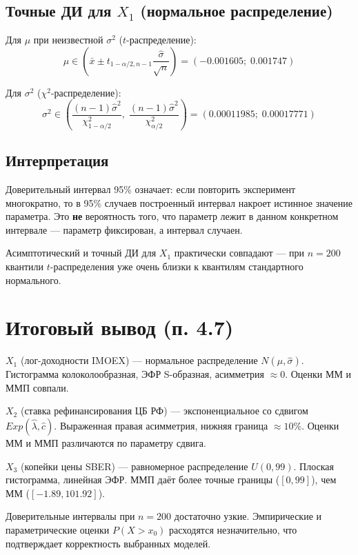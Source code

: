 \documentclass[12pt, a4paper]{article}
\begin{document}
\subsection{Точные ДИ для $X_1$ (нормальное распределение)}

Для $\mu$ при неизвестной $\sigma^2$ ($t$-распределение):
$$\mu \in \left(\bar x \pm t_{1-\alpha/2, n-1}\frac{\hat\sigma}{\sqrt{n}}\right) = (-0.001605;\; 0.001747)$$

Для $\sigma^2$ ($\chi^2$-распределение):
$$\sigma^2 \in \left(\frac{(n-1)\hat\sigma^2}{\chi^2_{1-\alpha/2}},\; \frac{(n-1)\hat\sigma^2}{\chi^2_{\alpha/2}}\right) = (0.00011985;\; 0.00017771)$$

\subsection{Интерпретация}

Доверительный интервал 95\% означает: если повторить эксперимент многократно, то в 95\% случаев построенный интервал накроет истинное значение параметра. Это \textbf{не} вероятность того, что параметр лежит в данном конкретном интервале --- параметр фиксирован, а интервал случаен.

Асимптотический и точный ДИ для $X_1$ практически совпадают --- при $n = 200$ квантили $t$-распределения уже очень близки к квантилям стандартного нормального.

\section{Итоговый вывод (п. 4.7)}

\textbf{$X_1$} (лог-доходности IMOEX) --- нормальное распределение $N(\hat\mu, \hat\sigma)$. Гистограмма колоколообразная, ЭФР S-образная, асимметрия $\approx 0$. Оценки ММ и ММП совпали.

\textbf{$X_2$} (ставка рефинансирования ЦБ РФ) --- экспоненциальное со сдвигом $Exp(\hat\lambda, \hat c)$. Выраженная правая асимметрия, нижняя граница $\approx 10\%$. Оценки ММ и ММП различаются по параметру сдвига.

\textbf{$X_3$} (копейки цены SBER) --- равномерное распределение $U(0, 99)$. Плоская гистограмма, линейная ЭФР. ММП даёт более точные границы ($[0, 99]$), чем ММ ($[-1.89, 101.92]$).

Доверительные интервалы при $n = 200$ достаточно узкие. Эмпирические и параметрические оценки $P(X > x_0)$ расходятся незначительно, что подтверждает корректность выбранных моделей.
\end{document}
